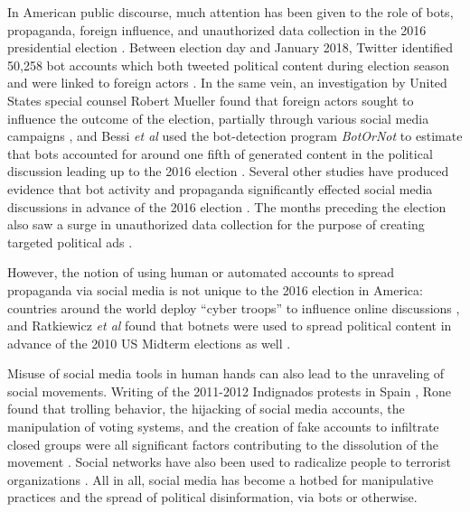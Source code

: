\documentclass[sigconf,authordraft]{acmart}
\newcommand{\etal}{{\itshape et al }}
\begin{document}
In American public discourse, much attention has been given to the role of bots, propaganda, foreign influence, and unauthorized data collection in the 2016 presidential election \cite{Quartz_twitterbotstory, CambridgeAnalyticaNYT, NYT_opinion_chatbot}. Between election day and January 2018, Twitter identified 50,258 bot accounts which both tweeted political content during election season and were linked to foreign actors \cite{Twitter2016BotReport}. In the same vein, an investigation by United States special counsel Robert Mueller found that foreign actors sought to influence the outcome of the election, partially through various social media campaigns \cite{mueller2019report}, and Bessi \etal used the bot-detection program {\itshape BotOrNot} \cite{davis2016botornot} to estimate that bots accounted for around one fifth of generated content in the political discussion leading up to the 2016 election \cite{bessi2016social}. Several other studies have  produced evidence that bot activity and propaganda significantly effected social media discussions in advance of the 2016 election \cite{howard2017junk, badawy2018analyzing, woolley2017computational, shao2018spread}. The months preceding the election also saw a surge in unauthorized data collection for the purpose of creating targeted political ads \cite{CambridgeAnalyticaNYT}.

However, the notion of using human or automated accounts to spread propaganda via social media is not unique to the 2016 election in America: countries around the world deploy ``cyber troops'' to influence online discussions \cite{bradshaw2017troops}, and Ratkiewicz \etal found that botnets were used to spread political content in advance of the 2010 US Midterm elections as well \cite{ratkiewicz2011truthy}.

Misuse of social media tools in human hands can also lead to the unraveling of social movements. Writing of the 2011-2012 Indignados protests in Spain \cite{indignadosBBC}, Rone found that trolling behavior, the hijacking of social media accounts, the manipulation of voting systems, and the creation of fake accounts to infiltrate closed groups were all significant factors contributing to the dissolution of the movement \cite{rone2019fake}. Social networks have also been used to radicalize people to terrorist organizations \cite{o2007virtual,Thompson2011radicalization}. All in all, social media has become a hotbed for manipulative practices and the spread of political disinformation, via bots or otherwise\cite{benkler2018network}.
\end{document}
